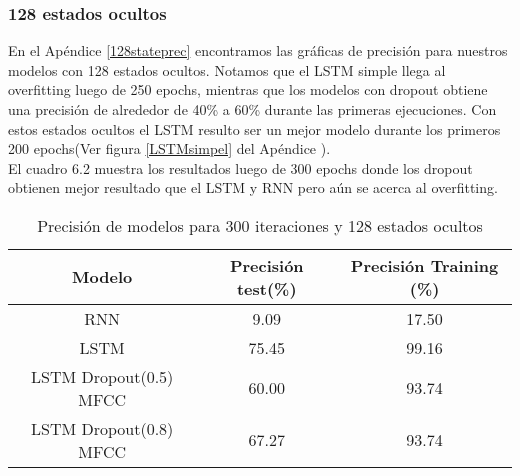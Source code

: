 \subsubsection{128 estados ocultos}

En el Apéndice \ref{128stateprec} encontramos las gráficas de precisión para nuestros modelos con 128 estados ocultos. Notamos que el LSTM simple llega al overfitting luego de 250 epochs, mientras que los modelos con dropout obtiene una precisión de alrededor de 40\% a 60\% durante las primeras ejecuciones. Con estos estados ocultos el LSTM resulto ser un mejor modelo durante los primeros 200 epochs(Ver figura \ref{LSTMsimpel} del Apéndice ).\\ El cuadro 6.2 muestra los resultados luego de 300 epochs donde los dropout obtienen mejor resultado que el LSTM y RNN pero aún se acerca al overfitting.
\begin{table}[H]
	\centering
	\begin{tabular}{|c|c|c|}
		\hline
		\rowcolor{Gray}  Modelo & Precisión test(\%) & Precisión Training (\%)\\ \hline
		RNN &        9.09  &             17.50   \\ \hline

		LSTM &        75.45  &          99.16      \\ \hline

		LSTM Dropout(0.5) MFCC&  60.00         &     93.74         \\ \hline

		LSTM Dropout(0.8) MFCC&	67.27		&	93.74		\\ \hline

	\end{tabular}
	\caption{Precisión de modelos para 300 iteraciones y 128 estados ocultos}
\end{table}
